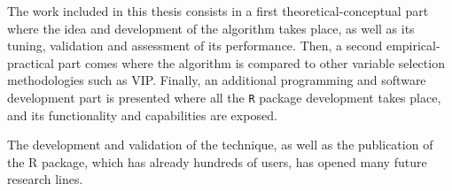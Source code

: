 The work included in this thesis consists in a first theoretical-conceptual part where the idea and development of the algorithm takes place, as well as its tuning, validation and assessment of its performance. Then, a second empirical-practical part comes where the algorithm is compared to other variable selection methodologies such as VIP. Finally, an additional programming and software development part is presented where all the \texttt{R} package development takes place, and its functionality and capabilities are exposed.

The development and validation of the technique, as well as the publication of the R package, which has already hundreds of users, has opened many future research lines.

\ifEBOOKPDF
	\bigskip
\else
	\vfill
\fi

